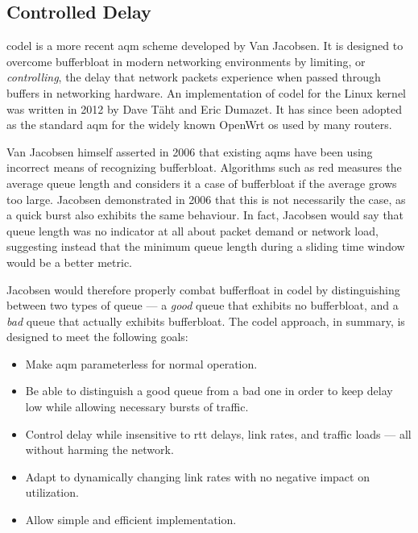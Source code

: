 \subsection{Controlled Delay}

\gls{codel} is a more recent \gls{aqm} scheme developed by Van Jacobsen. It is designed to overcome bufferbloat in modern networking environments by limiting, or \textit{controlling}, the delay that network packets experience when passed through buffers in networking hardware. An implementation of \gls{codel} for the Linux kernel was written in 2012 by Dave Täht and Eric Dumazet. It has since been adopted as the standard \gls{aqm} for the widely known OpenWrt \gls{os} used by many routers.

Van Jacobsen himself asserted in 2006 that existing \gls{aqm}s have been using incorrect means of recognizing bufferbloat. \cite{a_rant_on_queues} Algorithms such as \gls{red} measures the average queue length and considers it a case of bufferbloat if the average grows too large. Jacobsen demonstrated in 2006 that this is not necessarily the case, as a quick burst also exhibits the same behaviour. In fact, Jacobsen would say that queue length was no indicator at all about packet demand or network load, \cite{a_rant_on_queues, controlling_queue_delay} suggesting instead that the minimum queue length during a sliding time window would be a better metric. \cite{controlling_queue_delay}

Jacobsen would therefore properly combat bufferfloat in \gls{codel} by distinguishing between two types of queue --- a \textit{good} queue that exhibits no bufferbloat, and a \textit{bad} queue that actually exhibits bufferbloat. The \gls{codel} approach, in summary, is designed to meet the following goals: \cite{rfc8289}

\begin{itemize}
    \item Make \gls{aqm} parameterless for normal operation.
    \item Be able to distinguish a good queue from a bad one in order to keep delay low while allowing necessary bursts of traffic.
    \item Control delay while insensitive to \gls{rtt} delays, link rates, and traffic loads --- all without harming the network.
    \item Adapt to dynamically changing link rates with no negative impact on utilization.
    \item Allow simple and efficient implementation.
\end{itemize}





